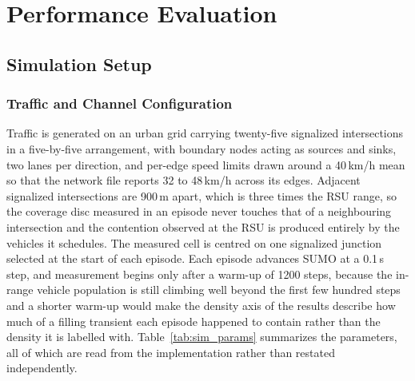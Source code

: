 \documentclass[journal]{IEEEtran}
\begin{document}
\section{Performance Evaluation}
\label{sec:evaluation}

\subsection{Simulation Setup}

\subsubsection{Traffic and Channel Configuration}
Traffic is generated on an urban grid carrying twenty-five signalized intersections in a five-by-five arrangement, with boundary nodes acting as sources and sinks, two lanes per direction, and per-edge speed limits drawn around a 40\,km/h mean so that the network file reports 32 to 48\,km/h across its edges. Adjacent signalized intersections are 900\,m apart, which is three times the RSU range, so the coverage disc measured in an episode never touches that of a neighbouring intersection and the contention observed at the RSU is produced entirely by the vehicles it schedules. The measured cell is centred on one signalized junction selected at the start of each episode. Each episode advances SUMO at a 0.1\,s step, and measurement begins only after a warm-up of 1200 steps, because the in-range vehicle population is still climbing well beyond the first few hundred steps and a shorter warm-up would make the density axis of the results describe how much of a filling transient each episode happened to contain rather than the density it is labelled with. Table~\ref{tab:sim_params} summarizes the parameters, all of which are read from the implementation rather than restated independently.
\end{document}
